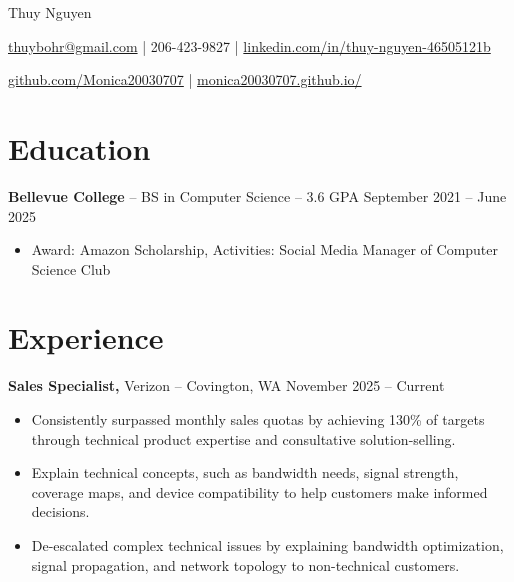 \documentclass[11pt]{article}       %
\begin{document}
\centerline{\Huge Thuy Nguyen}

\vspace{5pt}

\centerline{\href{mailto:thuybohr@gmail.com}{thuybohr@gmail.com} | 206-423-9827 |
\href{https://www.linkedin.com/in/thuy-nguyen-46505121b/}{linkedin.com/in/thuy-nguyen-46505121b}}

\centerline{\href{https://github.com/Monica20030707}{github.com/Monica20030707} | 
\href{https://monica20030707.github.io/}{monica20030707.github.io/}} 

\vspace{-9pt}

\section*{Education}
\textbf{Bellevue College} -- BS in Computer Science -- 3.6 GPA \hfill September 2021 -- June 2025\\
\vspace{-9pt}
\begin{itemize}
  \item Award: Amazon Scholarship, Activities: Social Media Manager of Computer Science Club
\end{itemize}

\vspace{-18.5pt}

\section*{Experience}

\textbf{Sales Specialist,} {Verizon} -- Covington, WA \hfill November 2025 -- Current \\
\vspace{-9pt}
\begin{itemize}
  \item Consistently surpassed monthly sales quotas by achieving 130\% of targets through technical product expertise and consultative solution-selling.
  \item Explain technical concepts, such as bandwidth needs, signal strength, coverage maps, and device compatibility to help customers make informed decisions.
  \item De-escalated complex technical issues by explaining bandwidth optimization, signal propagation, and network topology to non-technical customers.
\end{itemize}
\end{document}
